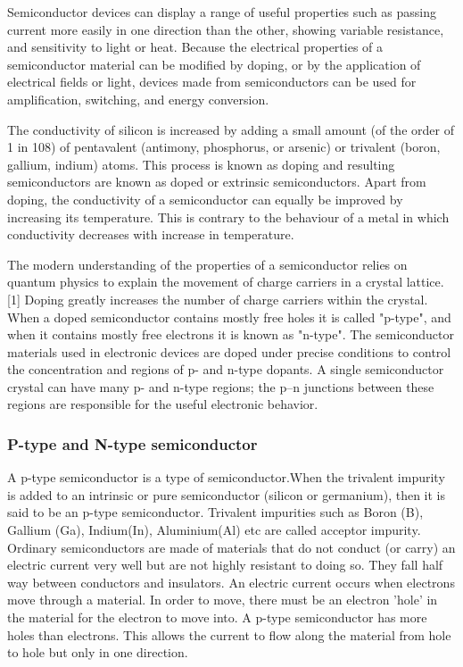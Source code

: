 \documentclass{article}
\begin{document}
Semiconductor devices can display a range of useful properties such as passing current more easily in one direction than the other, showing variable resistance, and sensitivity to light or heat. Because the electrical properties of a semiconductor material can be modified by doping, or by the application of electrical fields or light, devices made from semiconductors can be used for amplification, switching, and energy conversion.

The conductivity of silicon is increased by adding a small amount (of the order of 1 in 108) of pentavalent (antimony, phosphorus, or arsenic) or trivalent (boron, gallium, indium) atoms. This process is known as doping and resulting semiconductors are known as doped or extrinsic semiconductors. Apart from doping, the conductivity of a semiconductor can equally be improved by increasing its temperature. This is contrary to the behaviour of a metal in which conductivity decreases with increase in temperature.

The modern understanding of the properties of a semiconductor relies on quantum physics to explain the movement of charge carriers in a crystal lattice.[1] Doping greatly increases the number of charge carriers within the crystal. When a doped semiconductor contains mostly free holes it is called "p-type", and when it contains mostly free electrons it is known as "n-type". The semiconductor materials used in electronic devices are doped under precise conditions to control the concentration and regions of p- and n-type dopants. A single semiconductor crystal can have many p- and n-type regions; the p–n junctions between these regions are responsible for the useful electronic behavior.
	\newpage
	\subsubsection{P-type and  N-type semiconductor}
	A p-type semiconductor is a type of semiconductor.When the trivalent impurity is added to an intrinsic or pure semiconductor (silicon or germanium), then it is said to be an p-type semiconductor. Trivalent impurities such as Boron (B), Gallium (Ga), Indium(In), Aluminium(Al) etc are called acceptor impurity. Ordinary semiconductors are made of materials that do not conduct (or carry) an electric current very well but are not highly resistant to doing so. They fall half way between conductors and insulators. An electric current occurs when electrons move through a material. In order to move, there must be an electron 'hole' in the material for the electron to move into. A p-type semiconductor has more holes than electrons. This allows the current to flow along the material from hole to hole but only in one direction.
\end{document}
